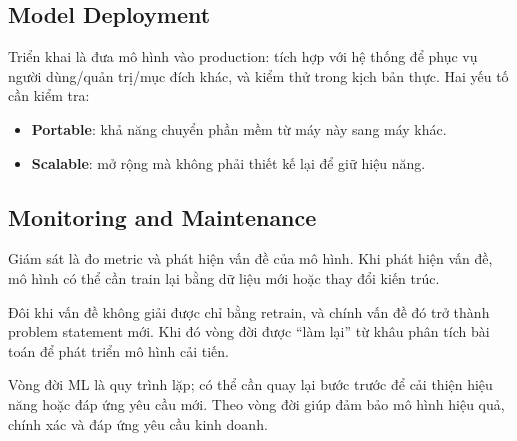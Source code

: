 \subsection{Model Deployment}

\begin{phuongphap}[title={Triển khai mô hình}]
Triển khai là đưa mô hình vào production: tích hợp với hệ thống để phục vụ người dùng/quản trị/mục đích khác, và kiểm thử trong kịch bản thực.
Hai yếu tố cần kiểm tra:
\begin{itemize}
  \item \textbf{Portable}: khả năng chuyển phần mềm từ máy này sang máy khác.
  \item \textbf{Scalable}: mở rộng mà không phải thiết kế lại để giữ hiệu năng.
\end{itemize}
\end{phuongphap}

\subsection{Monitoring and Maintenance}

\begin{dongco}[title={Giám sát để biết mô hình đang “xuống cấp”}]
Giám sát là đo metric và phát hiện vấn đề của mô hình.
Khi phát hiện vấn đề, mô hình có thể cần train lại bằng dữ liệu mới hoặc thay đổi kiến trúc.
\end{dongco}

\begin{luuy}[title={Khi vấn đề trở thành bài toán mới}]
Đôi khi vấn đề không giải được chỉ bằng retrain, và chính vấn đề đó trở thành problem statement mới.
Khi đó vòng đời được “làm lại” từ khâu phân tích bài toán để phát triển mô hình cải tiến.
\end{luuy}

\begin{ynghia}[title={Kết luận}]
Vòng đời ML là quy trình lặp; có thể cần quay lại bước trước để cải thiện hiệu năng hoặc đáp ứng yêu cầu mới.
Theo vòng đời giúp đảm bảo mô hình hiệu quả, chính xác và đáp ứng yêu cầu kinh doanh.
\end{ynghia}

\begin{vidu}[title={Hình minh hoạ vòng đời dự án ML}]
\end{vidu}
